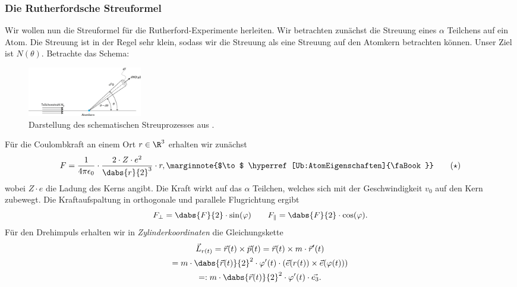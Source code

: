 \documentclass{subfiles}
\begin{document}
    \subsubsection*{Die Rutherfordsche Streuformel}
        Wir wollen nun die Streuformel für die Rutherford-Experimente herleiten. Wir betrachten zunächst die Streuung eines $\alpha$ Teilchens auf ein Atom. Die Streuung ist in der Regel sehr klein, sodass wir die Streuung als eine Streuung auf den Atomkern betrachten können. Unser Ziel ist $N(\theta)$. Betrachte das Schema:
        \begin{figure}[H]
            \centering
            \includegraphics[width=5cm]{Bilddateien/physiko.21.45_9783110445671-fig_001.jpg}
            \caption[short]{Darstellung des schematischen Streuprozesses aus \cite{degruyer:Streuung}.}
            \label{fig:Streuung}
        \end{figure}
        Für die Coulombkraft an einem Ort $r\in\R^3$ erhalten wir zunächst 
        \begin{align*}
            F=\frac{1}{4\pi\epsilon_0}\cdot\frac{2\cdot Z\cdot e^2}{\dabs{r}{2}^3}\cdot r, \label{Ub:CoulombKraftRutherford}\marginnote{$\to$ \hyperref[Ub:AtomEigenschaften]{\faBook}}\tag{$\star$}
        \end{align*}
        wobei $Z\cdot e$ die Ladung des Kerns angibt. Die Kraft wirkt auf das $\alpha$ Teilchen, welches sich mit der Geschwindigkeit $v_0$ auf den Kern zubewegt. 
        Die Kraftaufspaltung in orthogonale und parallele Flugrichtung ergibt
        \[F_\perp=\dabs{F}{2}\cdot\sin(\varphi)\qquad F_\parallel=\dabs{F}{2}\cdot\cos(\varphi).\]
        Für den Drehimpuls erhalten wir in \emph{Zylinderkoordinaten} die Gleichungskette
        \begin{multline*}
            \vec{L}_{r(t)}=\vec{r}(t)\times\vec{p}(t)=\vec{r}(t)\times m\cdot\vec{r}'(t)\\
            =m\cdot \dabs{\vec{r}(t)}{2}^2\cdot\varphi'(t)\cdot(\vec{e}(r(t))\times \vec{e}(\varphi(t)))\\
            =:m\cdot \dabs{\vec{r}(t)}{2}^2\cdot\varphi'(t)\cdot\vec{e_3}.
        \end{multline*} 
\end{document}
